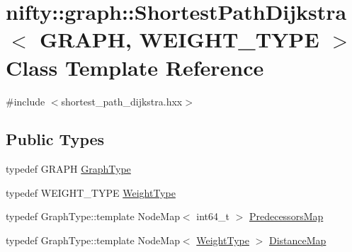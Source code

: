 \hypertarget{classnifty_1_1graph_1_1ShortestPathDijkstra}{}\section{nifty\+:\+:graph\+:\+:Shortest\+Path\+Dijkstra$<$ G\+R\+A\+PH, W\+E\+I\+G\+H\+T\+\_\+\+T\+Y\+PE $>$ Class Template Reference}
\label{classnifty_1_1graph_1_1ShortestPathDijkstra}


{\ttfamily \#include $<$shortest\+\_\+path\+\_\+dijkstra.\+hxx$>$}

\subsection*{Public Types}
\begin{DoxyCompactItemize}
\item 
typedef G\+R\+A\+PH \hyperlink{classnifty_1_1graph_1_1ShortestPathDijkstra_ab811998d24996c29b2ba613d9604b800}{Graph\+Type}
\item 
typedef W\+E\+I\+G\+H\+T\+\_\+\+T\+Y\+PE \hyperlink{classnifty_1_1graph_1_1ShortestPathDijkstra_a99783a7c717b74f48226852d73844fed}{Weight\+Type}
\item 
typedef Graph\+Type\+::template Node\+Map$<$ int64\+\_\+t $>$ \hyperlink{classnifty_1_1graph_1_1ShortestPathDijkstra_a87227c1cb37963c6a826889c693ab906}{Predecessors\+Map}
\item 
typedef Graph\+Type\+::template Node\+Map$<$ \hyperlink{classnifty_1_1graph_1_1ShortestPathDijkstra_a99783a7c717b74f48226852d73844fed}{Weight\+Type} $>$ \hyperlink{classnifty_1_1graph_1_1ShortestPathDijkstra_a7fd5b5d4bd9b9a6b9e8812b2c184c18a}{Distance\+Map}
\end{DoxyCompactItemize}
